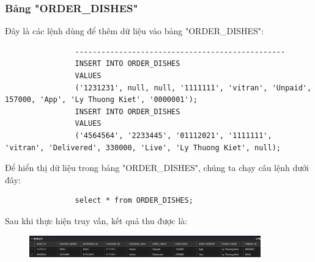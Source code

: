 \documentclass[13pt,a4paper]{article}
\begin{document}
			\subsubsection{Bảng "ORDER\_DISHES"}
			Đây là các lệnh dùng để thêm dữ liệu vào bảng "ORDER\_DISHES":
			\begin{lstlisting}				
				------------------------------------------------
				INSERT INTO ORDER_DISHES
				VALUES
				('1231231', null, null, '1111111', 'vitran', 'Unpaid', 157000, 'App', 'Ly Thuong Kiet', '0000001');
				INSERT INTO ORDER_DISHES
				VALUES
				('4564564', '2233445', '01112021', '1111111', 'vitran', 'Delivered', 330000, 'Live', 'Ly Thuong Kiet', null);
			\end{lstlisting}
			Để hiển thị dữ liệu trong bảng "ORDER\_DISHES", chúng ta chạy câu lệnh dưới đây:
			\begin{lstlisting}
				select * from ORDER_DISHES;
			\end{lstlisting}
			Sau khi thực hiện truy vấn, kết quả thu được là:
			\begin{figure}[h!]
				\begin{center}
					\includegraphics[width=10cm]{vitran/insert_od.png}
				\end{center}
			\end{figure}
		
\end{document}
